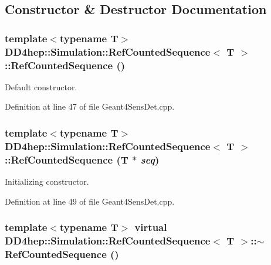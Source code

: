 \subsection{Constructor \& Destructor Documentation}
\hypertarget{class_d_d4hep_1_1_simulation_1_1_ref_counted_sequence_aff7f878ef368a341330fe3c5a8fd475d}{
\subsubsection[{RefCountedSequence}]{\setlength{\rightskip}{0pt plus 5cm}template$<$typename T$>$ {\bf DD4hep::Simulation::RefCountedSequence}$<$ {\bf T} $>$::{\bf RefCountedSequence} ()}}
\label{class_d_d4hep_1_1_simulation_1_1_ref_counted_sequence_aff7f878ef368a341330fe3c5a8fd475d}


Default constructor. 

Definition at line 47 of file Geant4SensDet.cpp.\hypertarget{class_d_d4hep_1_1_simulation_1_1_ref_counted_sequence_ab5c6370432d98faa4b0ba884afa63add}{
\subsubsection[{RefCountedSequence}]{\setlength{\rightskip}{0pt plus 5cm}template$<$typename T$>$ {\bf DD4hep::Simulation::RefCountedSequence}$<$ {\bf T} $>$::{\bf RefCountedSequence} ({\bf T} $\ast$ {\em seq})}}
\label{class_d_d4hep_1_1_simulation_1_1_ref_counted_sequence_ab5c6370432d98faa4b0ba884afa63add}


Initializing constructor. 

Definition at line 49 of file Geant4SensDet.cpp.\hypertarget{class_d_d4hep_1_1_simulation_1_1_ref_counted_sequence_a316644b6bcf4dd7e2b57588a9779bf59}{
\subsubsection[{$\sim$RefCountedSequence}]{\setlength{\rightskip}{0pt plus 5cm}template$<$typename T$>$ virtual {\bf DD4hep::Simulation::RefCountedSequence}$<$ {\bf T} $>$::$\sim${\bf RefCountedSequence} ()}}
\label{class_d_d4hep_1_1_simulation_1_1_ref_counted_sequence_a316644b6bcf4dd7e2b57588a9779bf59}


